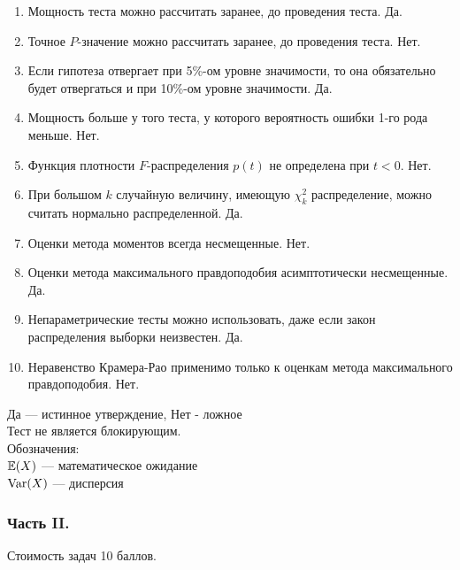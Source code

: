 \begin{enumerate}
\item Мощность теста можно рассчитать заранее, до проведения теста. Да.
\item Точное $P$-значение можно рассчитать заранее, до проведения теста. Нет.
\item Если гипотеза отвергает при 5\%-ом уровне значимости, то
она обязательно будет отвергаться и при 10\%-ом уровне значимости. Да.
\item Мощность больше у того теста, у которого вероятность ошибки
1-го рода меньше.  Нет.
\item Функция плотности $F$-распределения $p(t)$ не определена при $t<0$.  Нет.
\item При большом $k$ случайную величину, имеющую $\chi_{k}^{2}$ распределение, можно считать нормально распределенной. Да.
\item Оценки метода моментов всегда несмещенные.  Нет.
\item Оценки метода максимального правдоподобия асимптотически несмещенные. Да.
\item Непараметрические тесты можно использовать, даже если закон распределения выборки неизвестен. Да.
\item Неравенство Крамера-Рао применимо только к оценкам метода максимального правдоподобия. Нет.
\end{enumerate}

Да — истинное утверждение, Нет - ложное \\
Тест не является блокирующим. \\
Обозначения: \\
$\mathbb{E}(X)$ — математическое ожидание \\
$\operatorname{Var}(X)$ — дисперсия

\subsubsection*{Часть II.}

Стоимость задач 10 баллов.

